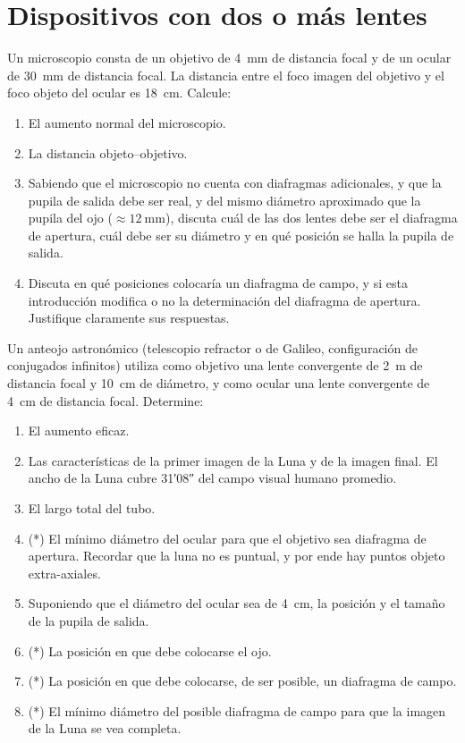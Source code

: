 \section*{Dispositivos con dos o más lentes}


\item Un microscopio consta de un objetivo de \SI{4}{\milli\metre} de distancia focal y de un ocular de \SI{30}{\milli\metre} de distancia focal.
La distancia entre el foco imagen del objetivo y el foco objeto del ocular es \SI{18}{\centi\metre}.
Calcule:
\begin{enumerate}
	\item El aumento normal del microscopio.
	\item La distancia objeto--objetivo.
	\item Sabiendo que el microscopio no cuenta con diafragmas adicionales, y que la pupila de salida debe ser real, y del mismo diámetro aproximado que la pupila del ojo (\(\approx \SI{12}{\milli\metre}\)), discuta cuál de las dos lentes debe ser el diafragma de apertura, cuál debe ser su diámetro y en qué posición se halla la pupila de salida.
	\item Discuta en qué posiciones colocaría un diafragma de campo, y si esta introducción modifica o no la determinación del diafragma de apertura.
	Justifique claramente sus respuestas.
\end{enumerate}



\item Un anteojo astronómico (telescopio refractor o de Galileo, configuración de conjugados infinitos) utiliza como objetivo una lente convergente de \SI{2}{\metre} de distancia focal y \SI{10}{\centi\metre} de diámetro, y como ocular una lente convergente de \SI{4}{\centi\metre} de distancia focal. 
Determine:
\begin{enumerate}
	\item El aumento eficaz.
	\item Las características de la primer imagen de la Luna y de la imagen final.
	El ancho de la Luna cubre \ang{;31;08} del campo visual humano promedio.
	\item El largo total del tubo.
	\item (*) El mínimo diámetro del ocular para que el objetivo sea diafragma de apertura.
	Recordar que la luna no es puntual, y por ende hay puntos objeto extra-axiales.
	\item Suponiendo que el diámetro del ocular sea de \SI{4}{\centi\metre}, la posición y el tamaño de la pupila de salida.
	\item (*) La posición en que debe colocarse el ojo.
	\item (*) La posición en que debe colocarse, de ser posible, un diafragma de campo.
	\item (*) El mínimo diámetro del posible diafragma de campo para que la imagen de la Luna se vea completa.
\end{enumerate}


